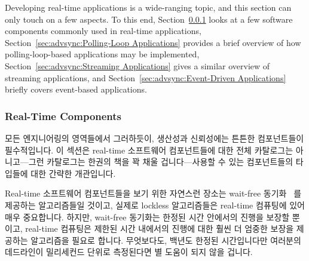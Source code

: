 Developing real-time applications is a wide-ranging topic, and this
section can only touch on a few aspects.
To this end,
Section~\ref{sec:advsync:Real-Time Components}
looks at a few software components commonly used in real-time applications,
Section~\ref{sec:advsync:Polling-Loop Applications}
provides a brief overview of how polling-loop-based applications may
be implemented,
Section~\ref{sec:advsync:Streaming Applications}
gives a similar overview of streaming applications, and
Section~\ref{sec:advsync:Event-Driven Applications}
briefly covers event-based applications.
\fi

\subsubsection{Real-Time Components}
\label{sec:advsync:Real-Time Components}

모든 엔지니어링의 영역들에서 그러하듯이, 생산성과 신뢰성에는 튼튼한
컴포넌트들이 필수적입니다.
이 섹션은 real-time 소프트웨어 컴포넌트들에 대한 전체 카탈로그는 아니고---그런
카탈로그는 한권의 책을 꽉 채울 겁니다---사용할 수 있는 컴포넌트들의 타입들에
대한 간략한 개관입니다.

Real-time 소프트웨어 컴포넌트들을 보기 위한 자연스런 장소는 wait-free
동기화~\cite{Herlihy91} 를 제공하는 알고리즘들일 것이고, 실제로 lockless
알고리즘들은 real-time 컴퓨팅에 있어 매우 중요합니다.
하지만, wait-free 동기화는 한정된 시간 안에서의 진행을 보장할 뿐이고, real-time
컴퓨팅은 제한된 시간 내에서의 진행에 대한 훨씬 더 엄중한 보장을 제공하는
알고리즘을 필요로 합니다.
무엇보다도, 백년도 한정된 시간입니다만 여러분의 데드라인이 밀리세컨드 단위로
측정된다면 별 도움이 되지 않을 겁니다.

